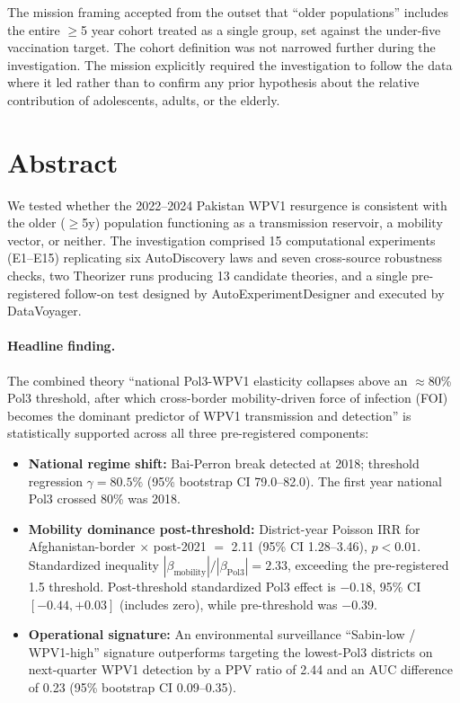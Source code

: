 \documentclass[11pt]{article}
\begin{document}
The mission framing accepted from the outset that ``older populations'' includes the entire $\geq$5 year cohort treated as a single group, set against the under-five vaccination target. The cohort definition was not narrowed further during the investigation. The mission explicitly required the investigation to follow the data where it led rather than to confirm any prior hypothesis about the relative contribution of adolescents, adults, or the elderly.

\section{Abstract}

We tested whether the 2022--2024 Pakistan WPV1 resurgence is consistent with the older ($\geq$5y) population functioning as a transmission reservoir, a mobility vector, or neither. The investigation comprised 15 computational experiments (E1--E15) replicating six AutoDiscovery laws and seven cross-source robustness checks, two Theorizer runs producing 13 candidate theories, and a single pre-registered follow-on test designed by AutoExperimentDesigner and executed by DataVoyager.

\paragraph{Headline finding.} The combined theory ``national Pol3-WPV1 elasticity collapses above an $\approx$80\% Pol3 threshold, after which cross-border mobility-driven force of infection (FOI) becomes the dominant predictor of WPV1 transmission and detection'' is statistically supported across all three pre-registered components:
\begin{itemize}[noitemsep]
\item \textbf{National regime shift:} Bai-Perron break detected at 2018; threshold regression $\gamma{=}80.5\%$ (95\% bootstrap CI 79.0--82.0). The first year national Pol3 crossed 80\% was 2018.
\item \textbf{Mobility dominance post-threshold:} District-year Poisson IRR for Afghanistan-border $\times$ post-2021 $=$ 2.11 (95\% CI 1.28--3.46), $p<0.01$. Standardized inequality $|\beta_\text{mobility}|/|\beta_\text{Pol3}|{=}2.33$, exceeding the pre-registered 1.5 threshold. Post-threshold standardized Pol3 effect is $-0.18$, 95\% CI $[-0.44, +0.03]$ (includes zero), while pre-threshold was $-0.39$.
\item \textbf{Operational signature:} An environmental surveillance ``Sabin-low / WPV1-high'' signature outperforms targeting the lowest-Pol3 districts on next-quarter WPV1 detection by a PPV ratio of 2.44 and an AUC difference of 0.23 (95\% bootstrap CI 0.09--0.35).
\end{itemize}
\end{document}
